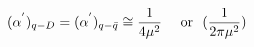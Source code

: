 \begin{equation}      
(\alpha^{'})_{q-D} = (\alpha^{'})_{q-\bar{q}} \cong \frac{1}{4 \mu^{2}}~~~~{\rm or} ~~(\frac{1}{2 \pi \mu^{2}})      
\end{equation} 
